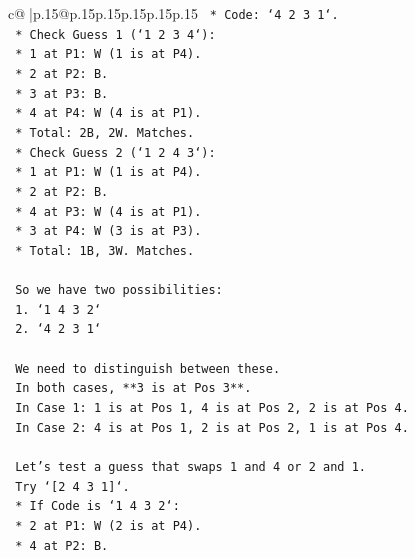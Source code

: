 \documentclass{article}
\begin{document}
{\begin{supertabular}{c@{$\;$}|p{.15\linewidth}@{}p{.15\linewidth}p{.15\linewidth}p{.15\linewidth}p{.15\linewidth}p{.15\linewidth}}
{{{\texttt{                                *   Code: `4 2 3 1`.} \\
\texttt{                                *   Check Guess 1 (`1 2 3 4`):} \\
\texttt{                                    *   1 at P1: W (1 is at P4).} \\
\texttt{                                    *   2 at P2: B.} \\
\texttt{                                    *   3 at P3: B.} \\
\texttt{                                    *   4 at P4: W (4 is at P1).} \\
\texttt{                                    *   Total: 2B, 2W. Matches.} \\
\texttt{                                *   Check Guess 2 (`1 2 4 3`):} \\
\texttt{                                    *   1 at P1: W (1 is at P4).} \\
\texttt{                                    *   2 at P2: B.} \\
\texttt{                                    *   4 at P3: W (4 is at P1).} \\
\texttt{                                    *   3 at P4: W (3 is at P3).} \\
\texttt{                                    *   Total: 1B, 3W. Matches.} \\
\\ 
\texttt{    So we have two possibilities:} \\
\texttt{    1.  `1 4 3 2`} \\
\texttt{    2.  `4 2 3 1`} \\
\\ 
\texttt{    We need to distinguish between these.} \\
\texttt{    In both cases, **3 is at Pos 3**.} \\
\texttt{    In Case 1: 1 is at Pos 1, 4 is at Pos 2, 2 is at Pos 4.} \\
\texttt{    In Case 2: 4 is at Pos 1, 2 is at Pos 2, 1 is at Pos 4.} \\
\\ 
\texttt{    Let's test a guess that swaps 1 and 4 or 2 and 1.} \\
\texttt{    Try `{[}2 4 3 1{]}`.} \\
\texttt{    *   If Code is `1 4 3 2`:} \\
\texttt{        *   2 at P1: W (2 is at P4).} \\
\texttt{        *   4 at P2: B.} \\
}}}
\end{supertabular}}
\end{document}
